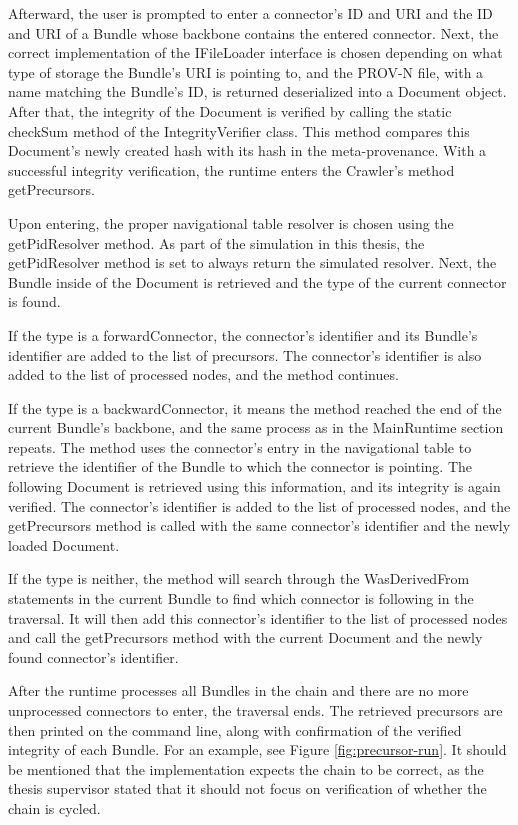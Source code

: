 \documentclass[
  digital,     %
  oneside,     %
  nosansbold,  %
  nocolorbold, %
  lof,         %
  lot,         %
]{fithesis4}
\begin{document}
Afterward, the user is prompted to enter a connector's ID and URI and the ID and URI of a Bundle whose backbone contains the entered connector. Next, the correct implementation of the IFileLoader interface is chosen depending on what type of storage the Bundle's URI is pointing to, and the PROV-N file, with a name matching the Bundle's ID, is returned deserialized into a Document object. After that, the integrity of the Document is verified by calling the static checkSum method of the IntegrityVerifier class. This method compares this Document's newly created hash with its hash in the meta-provenance. With a successful integrity verification, the runtime enters the Crawler's method getPrecursors.

Upon entering, the proper navigational table resolver is chosen using the getPidResolver method. As part of the simulation in this thesis, the getPidResolver method is set to always return the simulated resolver. Next, the Bundle inside of the Document is retrieved and the type of the current connector is found. 

If the type is a forwardConnector, the connector's identifier and its Bundle's identifier are added to the list of precursors. The connector's identifier is also added to the list of processed nodes, and the method continues. 

If the type is a backwardConnector, it means the method reached the end of the current Bundle's backbone, and the same process as in the MainRuntime section repeats. The method uses the connector's entry in the navigational table to retrieve the identifier of the Bundle to which the connector is pointing. The following Document is retrieved using this information, and its integrity is again verified. The connector's identifier is added to the list of processed nodes, and the getPrecursors method is called with the same connector's identifier and the newly loaded Document. 

If the type is neither, the method will search through the WasDerivedFrom statements in the current Bundle to find which connector is following in the traversal. It will then add this connector's identifier to the list of processed nodes and call the getPrecursors method with the current Document and the newly found connector's identifier. 

After the runtime processes all Bundles in the chain and there are no more unprocessed connectors to enter, the traversal ends. The retrieved precursors are then printed on the command line, along with confirmation of the verified integrity of each Bundle. For an example, see Figure \ref{fig:precursor-run}. It should be mentioned that the implementation expects the chain to be correct, as the thesis supervisor stated that it should not focus on verification of whether the chain is cycled.
\end{document}
